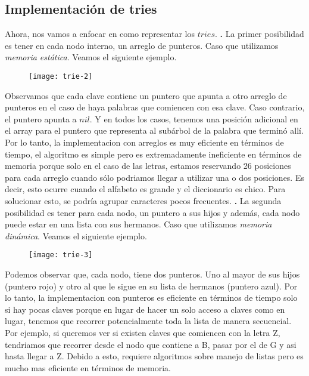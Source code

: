 \documentclass[10pt,a4paper]{article}
\begin{document}
\subsection{Implementación de tries}

Ahora, nos vamos a enfocar en como representar los $tries$.
\newline
\newline
\textbf{.} La primer posibilidad es tener en cada nodo interno, un arreglo de punteros. Caso que utilizamos \textit{memoria estática}. Veamos el siguiente ejemplo.

\begin{figure}[h]
	\centering
\texttt{[image: trie-2]}
	\label{drivers1}
\end{figure}

Observamos que cada clave contiene un puntero que apunta a otro arreglo de punteros en el caso de haya palabras que comiencen con esa clave. Caso contrario, el puntero apunta a $nil$. Y en todos los casos, tenemos una posición adicional en el array para el puntero que representa al subárbol de la palabra que terminó allí.
\newline
\newline
Por lo tanto, la implementacion con arreglos es muy eficiente en términos de tiempo, el algoritmo es simple pero es extremadamente ineficiente en términos de memoria porque solo en el caso de las letras, estamos reservando 26 posiciones para cada arreglo cuando sólo podriamos llegar a utilizar una o dos posiciones. Es decir, esto ocurre cuando el alfabeto es grande y el diccionario es chico. Para solucionar esto, se podría agrupar caracteres pocos frecuentes. 
\newpage
\textbf{.} La segunda posibilidad es tener para cada nodo, un puntero a sus hijos y además, cada nodo puede estar en una lista con sus hermanos. Caso que utilizamos \textit{memoria dinámica}. Veamos el siguiente ejemplo.

\begin{figure}[h]
	\centering
\texttt{[image: trie-3]}
	\label{drivers1}
\end{figure}

Podemos observar que, cada nodo, tiene dos punteros. Uno al mayor de sus hijos (puntero rojo) y otro al que le sigue en su lista de hermanos (puntero azul).
\newline
\newline
Por lo tanto, la implementacion con punteros es eficiente en términos de tiempo solo si hay pocas claves porque en lugar de hacer un solo acceso a claves como en lugar, tenemos que recorrer potencialmente toda la lista de manera secuencial. Por ejemplo, si queremos ver si existen claves que comiencen con la letra Z, tendriamos que recorrer desde el nodo que contiene a B, pasar por el de G y asi hasta llegar a Z. Debido a esto, requiere algoritmos sobre manejo de listas pero es mucho mas eficiente en términos de memoria. 
\end{document}
